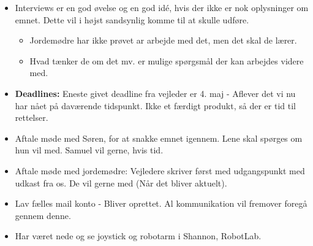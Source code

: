 \begin{itemize}
	\item Interviews er en god øvelse og en god idé, hvis der ikke er nok oplysninger om emnet. Dette vil i højst sandsynlig komme til at skulle udføre.
	\begin{itemize}
		\item Jordemødre har ikke prøvet ar arbejde med det, men det skal de lærer. 
		\item Hvad tænker de om det mv. er mulige spørgsmål der kan arbejdes videre med.
	\end{itemize}
	\item \textbf{Deadlines:} Eneste givet deadline fra vejleder er 4. maj - Aflever det vi nu har nået på daværende tidspunkt. Ikke et færdigt produkt, så der er tid til rettelser.
	\item Aftale møde med Søren, for at snakke emnet igennem. Lene skal spørges om hun vil med. Samuel vil gerne, hvis tid.
	\item Aftale møde med jordemødre: Vejledere skriver først med udgangspunkt med udkast fra os. De vil gerne med (Når det bliver aktuelt). 
	\item Lav fælles mail konto - Bliver oprettet. Al kommunikation vil fremover foregå gennem denne.
	\item Har været nede og se joystick og robotarm i Shannon, RobotLab.  
\end{itemize}

\newpage


